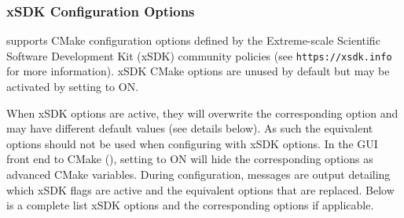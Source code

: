 \subsubsection*{xSDK Configuration Options}

{\sundials} supports CMake configuration options defined by the
Extreme-scale Scientific Software Development Kit (xSDK) community
policies (see {\tt https://xsdk.info} for more information). xSDK
CMake options are unused by default but may be activated by setting
 to ON.

{\warn} When xSDK options are active, they will overwrite the
corresponding {\sundials} option and may have different default values
(see details below). As such the equivalent {\sundials} options should
not be used when configuring with xSDK options. In the GUI front end
to CMake (), setting  to ON will
hide the corresponding {\sundials} options as advanced CMake variables.
During configuration, messages are output detailing
which xSDK flags are active and the equivalent {\sundials} options
that are replaced. Below is a complete list xSDK options and the
corresponding {\sundials} options if applicable.

